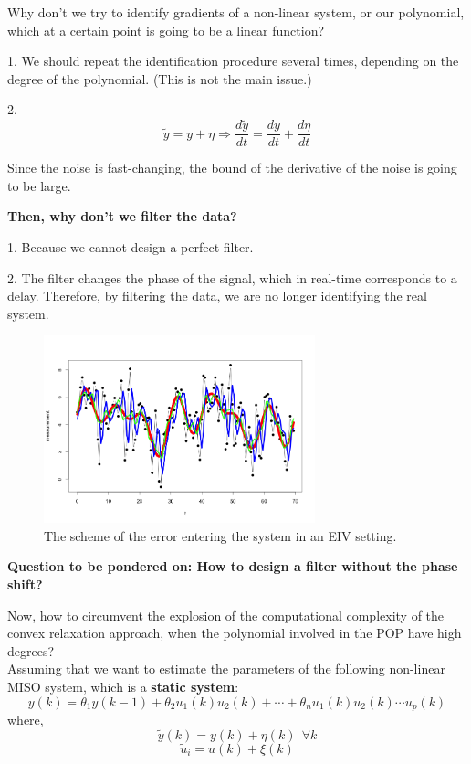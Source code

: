 \begin{factbox}
Why don't we try to identify gradients of a non-linear system, or our polynomial, which at a certain point is going to be a linear function?

1. We should repeat the identification procedure several times, depending on the degree of the polynomial. (This is not the main issue.)

2. 
\[
\tilde{y} = y + \eta \Rightarrow \frac{d\tilde{y}}{dt} = \frac{dy}{dt} + \frac{d\eta}{dt}
\]


Since the noise is fast-changing, the bound of the derivative of the noise is going to be large.

\textbf{Then, why don't we filter the data?}

1. Because we cannot design a perfect filter.

2. The filter changes the phase of the signal, which in real-time corresponds to a delay. Therefore, by filtering the data, we are no longer identifying the real system.
\end{factbox}

\begin{figure}[htbp]
    \centering
    \includegraphics[width=0.7\textwidth]{images/signal-and-noise.png}
    \caption{The scheme of the error entering the system in an EIV setting.}
    \label{fig:signal-and-noise}
\end{figure}

\newpage

\textbf{Question to be pondered on: How to design a filter without the phase shift?}

Now, how to circumvent the explosion of the computational complexity of the convex relaxation approach, when the polynomial involved in the POP have high degrees?\\
Assuming that we want to estimate the parameters of the following non-linear MISO system, which is a \textbf{static system}:
\[
y(k) = \theta_1y(k-1) + \theta_2u_1(k)u_2(k) + \cdots + \theta_n u_1(k)u_2(k)\cdots u_p(k)
\]
where,
\[
\tilde{y}(k) = y(k)+\eta(k) \:\:\forall k
\]
\[
\tilde{u}_i = u(k)+\xi(k)
\]

